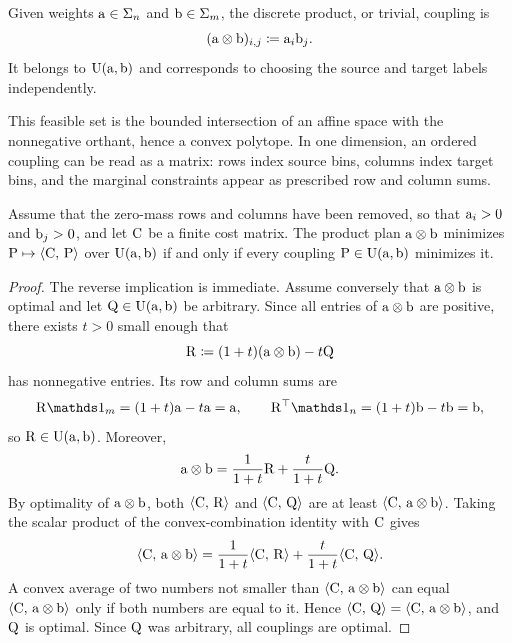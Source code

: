 \begin{defn}\label{def-discrete-product-coupling}
	Given weights $\mathrm{a}\in\Sigma_n$ and $\mathrm{b}\in\Sigma_m$, the discrete product, or trivial, coupling is
	\[
		(\mathrm{a}\otimes\mathrm{b})_{i,j}\coloneqq \mathrm{a}_i\mathrm{b}_j.
	\]
	It belongs to $\mathrm{U}(\mathrm{a},\mathrm{b})$ and corresponds to choosing the source and target labels independently.
\end{defn}
This feasible set is the bounded intersection of an affine space with the nonnegative orthant, hence a convex polytope. In one dimension, an ordered coupling can be read as a matrix: rows index source bins, columns index target bins, and the marginal constraints appear as prescribed row and column sums.

\begin{prop}\label{prop-discrete-product-coupling-degenerate}
	Assume that the zero-mass rows and columns have been removed, so that $\mathrm{a}_i>0$ and $\mathrm{b}_j>0$, and let $\mathrm{C}$ be a finite cost matrix. The product plan $\mathrm{a}\otimes\mathrm{b}$ minimizes $\mathrm{P}\mapsto\langle \mathrm{C},\,\mathrm{P}\rangle$ over $\mathrm{U}(\mathrm{a},\mathrm{b})$ if and only if every coupling $\mathrm{P}\in\mathrm{U}(\mathrm{a},\mathrm{b})$ minimizes it.
\end{prop}
\begin{proof}
	The reverse implication is immediate. Assume conversely that $\mathrm{a}\otimes\mathrm{b}$ is optimal and let $\mathrm{Q}\in\mathrm{U}(\mathrm{a},\mathrm{b})$ be arbitrary. Since all entries of $\mathrm{a}\otimes\mathrm{b}$ are positive, there exists $t>0$ small enough that
	\[
		\mathrm{R}\coloneqq (1+t)(\mathrm{a}\otimes\mathrm{b})-t\mathrm{Q}
	\]
	has nonnegative entries. Its row and column sums are
	\[
		\R\ones_m=(1+t)\a-t\a=\a,
		\qquad
		\R^\top\ones_n=(1+t)\b-t\b=\b,
	\]
	so $\mathrm{R}\in\mathrm{U}(\mathrm{a},\mathrm{b})$. Moreover,
	\[
		\mathrm{a}\otimes\mathrm{b}=\frac{1}{1+t}\mathrm{R}+\frac{t}{1+t}\mathrm{Q}.
	\]
	By optimality of $\mathrm{a}\otimes\mathrm{b}$, both $\langle \mathrm{C},\,\mathrm{R}\rangle$ and $\langle \mathrm{C},\,\mathrm{Q}\rangle$ are at least $\langle \mathrm{C},\,\mathrm{a}\otimes\mathrm{b}\rangle$. Taking the scalar product of the convex-combination identity with $\mathrm{C}$ gives
	\[
		\langle \mathrm{C},\,\mathrm{a}\otimes\mathrm{b}\rangle
		=
		\frac{1}{1+t}\langle \mathrm{C},\,\mathrm{R}\rangle
		+\frac{t}{1+t}\langle \mathrm{C},\,\mathrm{Q}\rangle.
	\]
	A convex average of two numbers not smaller than $\langle \mathrm{C},\,\mathrm{a}\otimes\mathrm{b}\rangle$ can equal $\langle \mathrm{C},\,\mathrm{a}\otimes\mathrm{b}\rangle$ only if both numbers are equal to it. Hence $\langle \mathrm{C},\,\mathrm{Q}\rangle=\langle \mathrm{C},\,\mathrm{a}\otimes\mathrm{b}\rangle$, and $\mathrm{Q}$ is optimal. Since $\mathrm{Q}$ was arbitrary, all couplings are optimal.
\end{proof}

